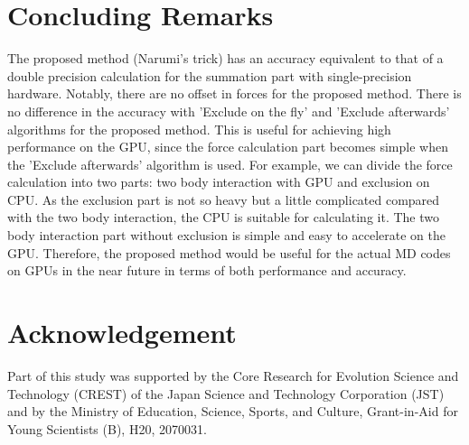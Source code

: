 \section{Concluding Remarks}\label{sec:conclude}

The proposed method (Narumi's trick) has an accuracy equivalent to
that of a double precision calculation for the summation part
with single-precision hardware.
Notably, there are no offset in forces for the proposed method.  There
is no difference in the accuracy with 'Exclude on the fly' and
'Exclude afterwards' algorithms for the proposed method.  This is
useful for achieving high performance on the GPU, since the force
calculation part becomes simple when the 'Exclude afterwards'
algorithm is used.  For example, we can divide the force calculation
into two parts: two body interaction with GPU and exclusion on CPU. As
the exclusion part is not so heavy but a little complicated compared
with the two body interaction, the CPU is suitable for calculating it.
The two body interaction part without exclusion is simple and easy to
accelerate on the GPU. Therefore, the proposed method would be useful
for the actual MD codes on GPUs in the near future in terms of both
performance and accuracy.

\section*{Acknowledgement} 
Part of this study was supported by the Core 
Research for Evolution Science and Technology (CREST) of the Japan 
Science and Technology Corporation (JST)
and by the Ministry of Education, Science, Sports, and Culture,
Grant-in-Aid for Young Scientists (B), H20, 2070031.

